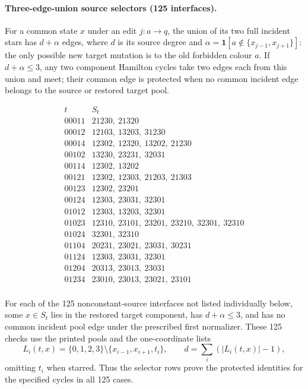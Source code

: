 \paragraph{Three-edge-union source selectors (125 interfaces).}
For a common state $x$ under an edit $j:a\to q$, the union of its
two full incident stars has $d+\alpha$ edges, where $d$ is its source
degree and $\alpha=\mathbf1[a\notin\{x_{j-1},x_{j+1}\}]$:
the only possible new target mutation is to the old forbidden colour $a$.
If $d+\alpha\le3$, any two component Hamilton cycles take two edges
each from this union and meet; their common edge is protected when
no common incident edge belongs to the source or restored target pool.

\[\begin{array}{c|l}t&S_t\\\hline
00011&21230,\ 21320\\
00012&12103,\ 13203,\ 31230\\
00014&12302,\ 12320,\ 13202,\ 21230\\
00102&13230,\ 23231,\ 32031\\
00114&12302,\ 13202\\
00121&12302,\ 12303,\ 21203,\ 21303\\
00123&12302,\ 23201\\
00124&12303,\ 23031,\ 32301\\
01012&12303,\ 13203,\ 32301\\
01023&12310,\ 23101,\ 23201,\ 23210,\ 32301,\ 32310\\
01024&32301,\ 32310\\
01104&20231,\ 23021,\ 23031,\ 30231\\
01124&12303,\ 23031,\ 32301\\
01204&20313,\ 23013,\ 23031\\
01234&23010,\ 23013,\ 23021,\ 23101\\
\end{array}\]

For each of the 125 nonconstant-source interfaces not listed individually
below, some $x\in S_t$ lies in the restored
target component, has $d+\alpha\le3$, and has no common incident
pool edge under the prescribed first normalizer. These 125 checks use
the printed pools and the one-coordinate lists
\[
L_i(t,x)=\{0,1,2,3\}\setminus\{x_{i-1},x_{i+1},t_i\},\qquad
d=\sum_i(|L_i(t,x)|-1),
\]
omitting $t_i$ when starred. Thus the selector rows prove the protected
identities for the specified cycles in all 125 cases.

